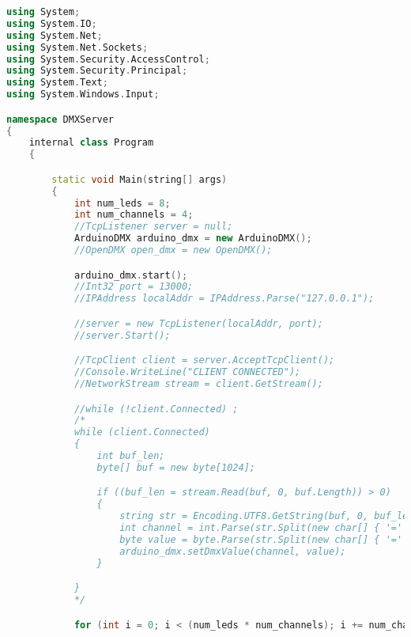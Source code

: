 \begin{lstlisting}[language=C++]
using System;
using System.IO;
using System.Net;
using System.Net.Sockets;
using System.Security.AccessControl;
using System.Security.Principal;
using System.Text;
using System.Windows.Input;

namespace DMXServer
{
    internal class Program
    {

        static void Main(string[] args)
        {
            int num_leds = 8;
            int num_channels = 4;
            //TcpListener server = null;
            ArduinoDMX arduino_dmx = new ArduinoDMX();
            //OpenDMX open_dmx = new OpenDMX();

            arduino_dmx.start();
            //Int32 port = 13000;
            //IPAddress localAddr = IPAddress.Parse("127.0.0.1");

            //server = new TcpListener(localAddr, port);
            //server.Start();

            //TcpClient client = server.AcceptTcpClient();
            //Console.WriteLine("CLIENT CONNECTED");
            //NetworkStream stream = client.GetStream();

            //while (!client.Connected) ;
            /*
            while (client.Connected)
            {
                int buf_len;
                byte[] buf = new byte[1024];

                if ((buf_len = stream.Read(buf, 0, buf.Length)) > 0)
                {
                    string str = Encoding.UTF8.GetString(buf, 0, buf_len).ToString();
                    int channel = int.Parse(str.Split(new char[] { '=' })[0]);
                    byte value = byte.Parse(str.Split(new char[] { '=' })[1]);
                    arduino_dmx.setDmxValue(channel, value);
                }

            }
            */

            for (int i = 0; i < (num_leds * num_channels); i += num_channels) { arduino_dmx.setDmxValue(i, 200); }


\end{lstlisting}
